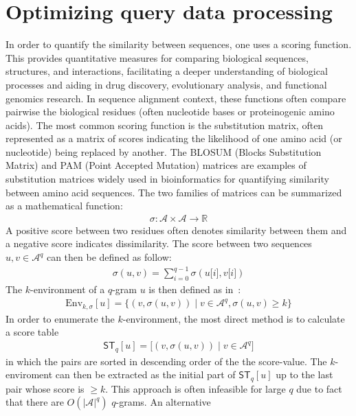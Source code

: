 \documentclass[twoside,a4paper,bsc]{master}
\newcommand{\Qgram}[1]{\(#1\)-gram}
\newcommand{\Subchar}[2]{#1\lbrack #2\rbrack}
\newcommand{\Scoretablename}[0]{\mathsf{ST}}
\newcommand{\Scoretable}[2]{\Scoretablename_{#1}[#2]}
\newcommand{\Reals}{\mathbb{R}}
\newcommand{\Alpha}[0]{\mathcal{A}}
\begin{document}
\section{Optimizing query data processing\label{section:qgramgen}}
In order to quantify the similarity between sequences, one uses a scoring
function. This provides quantitative measures for comparing biological
sequences, structures, and interactions, facilitating a deeper
understanding of biological processes and aiding in drug discovery,
evolutionary analysis, and functional genomics research.
In sequence
alignment context, these functions often compare pairwise the biological
residues (often nucleotide bases or proteinogenic amino acids). The most
common scoring function is the substitution matrix, often represented as a
matrix of scores indicating the likelihood of one amino acid (or
nucleotide) being replaced by another. The BLOSUM (Blocks Substitution
Matrix) and PAM (Point Accepted Mutation) matrices are examples of
substitution matrices widely used in bioinformatics for quantifying
similarity
between amino acid sequences.
The two families of
matrices can be summarized as a mathematical function:
\begin{align}
\sigma: \mathcal{A} \times \mathcal{A} \rightarrow \Reals
\end{align}
A positive score between two residues often denotes similarity between them
and a negative score indicates dissimilarity. The score between two
sequences \(u,v\in \Alpha^q\) can then be defined as follow:
\begin{align}
\sigma(u,v)=\sum_{i=0}^{q-1}\sigma(\Subchar{u}{i},\Subchar{v}{i})\label{equation:sequenceScore}
\end{align}
The \(k\)-environment of a \Qgram{q} \(u\) is then defined as
in~\cite{gsa}:
\begin{align}
\text{Env}_{k,\sigma}[u] = \{(v,\sigma(u,v))\mid v\in
\Alpha^q,\sigma(u,v)\geq
k\}
\end{align}
In order to enumerate the \(k\)-environment, the most direct
method is to calculate a score table
\begin{align}
\Scoretable{q}{u}=\lbrack (v,\sigma(u,v))\mid v\in\Alpha^{q}\rbrack
\label{eq:scoreTableDef}
\end{align}
in which the pairs are sorted in descending order of the the score-value.
The \(k\)-enviroment
can then be extracted as the initial part of \(\Scoretable{q}{u}\) up to
the
last pair whose score is \(\geq k\).
This approach is often infeasible for large \(q\) due to fact that there
are \(O(|\Alpha|^{q})\) \(q\)-grams. An alternative
\end{document}
